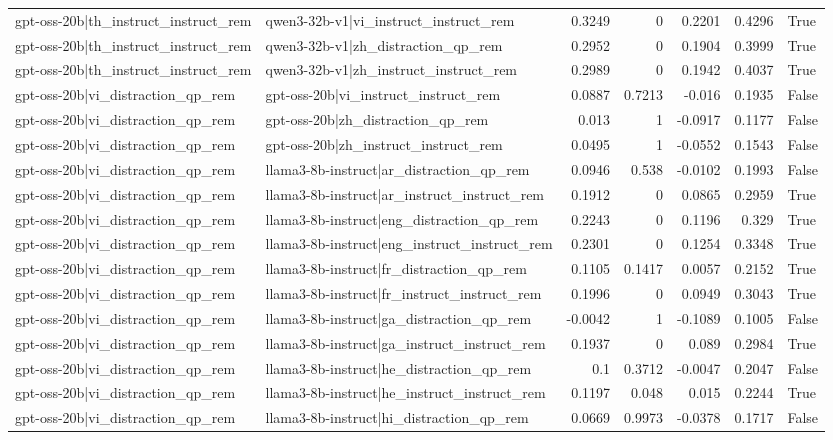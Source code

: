 \begin{table}
\begin{tabular}{l l r r r r l}
gpt-oss-20b|th_instruct_instruct_rem & qwen3-32b-v1|vi_instruct_instruct_rem & 0.3249 & 0 & 0.2201 & 0.4296 & True \\
gpt-oss-20b|th_instruct_instruct_rem & qwen3-32b-v1|zh_distraction_qp_rem & 0.2952 & 0 & 0.1904 & 0.3999 & True \\
gpt-oss-20b|th_instruct_instruct_rem & qwen3-32b-v1|zh_instruct_instruct_rem & 0.2989 & 0 & 0.1942 & 0.4037 & True \\
gpt-oss-20b|vi_distraction_qp_rem & gpt-oss-20b|vi_instruct_instruct_rem & 0.0887 & 0.7213 & -0.016 & 0.1935 & False \\
gpt-oss-20b|vi_distraction_qp_rem & gpt-oss-20b|zh_distraction_qp_rem & 0.013 & 1 & -0.0917 & 0.1177 & False \\
gpt-oss-20b|vi_distraction_qp_rem & gpt-oss-20b|zh_instruct_instruct_rem & 0.0495 & 1 & -0.0552 & 0.1543 & False \\
gpt-oss-20b|vi_distraction_qp_rem & llama3-8b-instruct|ar_distraction_qp_rem & 0.0946 & 0.538 & -0.0102 & 0.1993 & False \\
gpt-oss-20b|vi_distraction_qp_rem & llama3-8b-instruct|ar_instruct_instruct_rem & 0.1912 & 0 & 0.0865 & 0.2959 & True \\
gpt-oss-20b|vi_distraction_qp_rem & llama3-8b-instruct|eng_distraction_qp_rem & 0.2243 & 0 & 0.1196 & 0.329 & True \\
gpt-oss-20b|vi_distraction_qp_rem & llama3-8b-instruct|eng_instruct_instruct_rem & 0.2301 & 0 & 0.1254 & 0.3348 & True \\
gpt-oss-20b|vi_distraction_qp_rem & llama3-8b-instruct|fr_distraction_qp_rem & 0.1105 & 0.1417 & 0.0057 & 0.2152 & True \\
gpt-oss-20b|vi_distraction_qp_rem & llama3-8b-instruct|fr_instruct_instruct_rem & 0.1996 & 0 & 0.0949 & 0.3043 & True \\
gpt-oss-20b|vi_distraction_qp_rem & llama3-8b-instruct|ga_distraction_qp_rem & -0.0042 & 1 & -0.1089 & 0.1005 & False \\
gpt-oss-20b|vi_distraction_qp_rem & llama3-8b-instruct|ga_instruct_instruct_rem & 0.1937 & 0 & 0.089 & 0.2984 & True \\
gpt-oss-20b|vi_distraction_qp_rem & llama3-8b-instruct|he_distraction_qp_rem & 0.1 & 0.3712 & -0.0047 & 0.2047 & False \\
gpt-oss-20b|vi_distraction_qp_rem & llama3-8b-instruct|he_instruct_instruct_rem & 0.1197 & 0.048 & 0.015 & 0.2244 & True \\
gpt-oss-20b|vi_distraction_qp_rem & llama3-8b-instruct|hi_distraction_qp_rem & 0.0669 & 0.9973 & -0.0378 & 0.1717 & False \\

\end{tabular}
\end{table}
